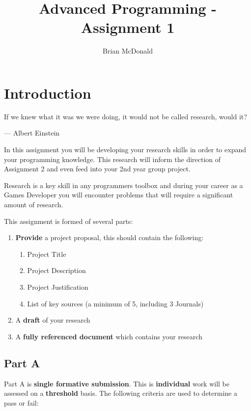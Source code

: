 \documentclass{../../fal_assignment}
\title{Advanced Programming - Assignment 1}
\author{Brian McDonald}
\begin{document}
\maketitle

\section*{Introduction}

\begin{marginquote}
If we knew what it was we were doing, it would not be called research, would it?

--- Albert Einstein

\end{marginquote}

In this assignment you will be developing your research skills in order to expand your programming knowledge. This research will inform the direction of Assignment 2 and even feed into your 2nd year group project.

Research is a key skill in any programmers toolbox and during your career as a Games Developer you will encounter problems that will require a significant amount of research.

This assignment is formed of several parts:

\begin{enumerate}[label=(\Alph*)]
	\item \textbf{Provide} a project proposal, this should contain the following:
	\begin{enumerate}
		\item Project Title
		\item Project Description
		\item Project Justification
		\item List of key sources  (a minimum of 5, including 3 Journals) 
	\end{enumerate}
    \item A \textbf{draft} of your research
    \item A \textbf{fully referenced document} which contains your research
\end{enumerate}

\subsection*{Part A}

Part A is \textbf{single formative submission}. This is \textbf{individual} work will be assessed on a \textbf{threshold} basis. The following criteria are used to determine a pass or fail: 
\end{document}

